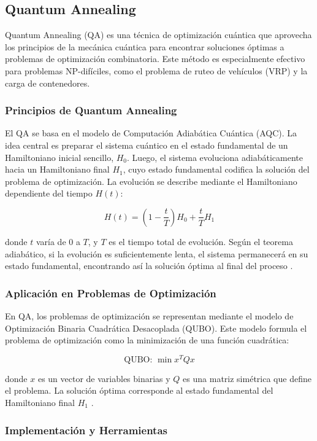 \documentclass[11pt,a4paper,spanish]{book}
\begin{document}
\subsection{Quantum Annealing}

Quantum Annealing (QA) es una técnica de optimización cuántica que aprovecha los principios de la mecánica cuántica para encontrar soluciones óptimas a problemas de optimización combinatoria. Este método es especialmente efectivo para problemas NP-difíciles, como el problema de ruteo de vehículos (VRP) y la carga de contenedores.

\subsubsection{Principios de Quantum Annealing}

El QA se basa en el modelo de Computación Adiabática Cuántica (AQC). La idea central es preparar el sistema cuántico en el estado fundamental de un Hamiltoniano inicial sencillo, \(H_0\). Luego, el sistema evoluciona adiabáticamente hacia un Hamiltoniano final \(H_1\), cuyo estado fundamental codifica la solución del problema de optimización. La evolución se describe mediante el Hamiltoniano dependiente del tiempo \(H(t)\):

\[ H(t) = (1 - \frac{t}{T}) H_0 + \frac{t}{T} H_1 \]

donde \(t\) varía de 0 a \(T\), y \(T\) es el tiempo total de evolución. Según el teorema adiabático, si la evolución es suficientemente lenta, el sistema permanecerá en su estado fundamental, encontrando así la solución óptima al final del proceso \cite{farhiQuantum}.

\subsubsection{Aplicación en Problemas de Optimización}

En QA, los problemas de optimización se representan mediante el modelo de Optimización Binaria Cuadrática Desacoplada (QUBO). Este modelo formula el problema de optimización como la minimización de una función cuadrática:

\[ \text{QUBO: } \min x^T Q x \]

donde \(x\) es un vector de variables binarias y \(Q\) es una matriz simétrica que define el problema. La solución óptima corresponde al estado fundamental del Hamiltoniano final \(H_1\) \cite{phillipson2024}.

\subsubsection{Implementación y Herramientas}
\end{document}
